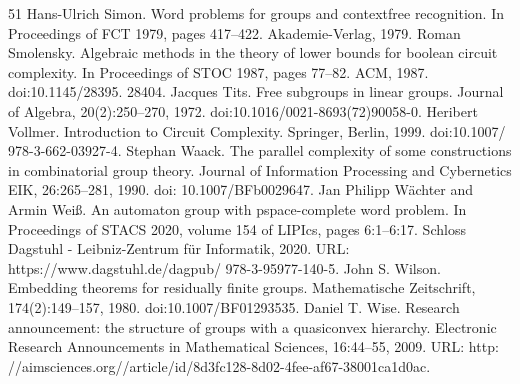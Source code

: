 \documentclass[10pt,a4paper]{article}
\begin{document}
\begin{thebibliography}{51}
 Hans-Ulrich Simon. Word problems for groups and contextfree recognition. In Proceedings of FCT 1979, pages 417–422. Akademie-Verlag, 1979.
 Roman Smolensky. Algebraic methods in the theory of lower bounds for boolean circuit complexity. In Proceedings of STOC 1987, pages 77–82. ACM, 1987. doi:10.1145/28395. 28404.
 Jacques Tits. Free subgroups in linear groups. Journal of Algebra, 20(2):250–270, 1972. doi:10.1016/0021-8693(72)90058-0.
 Heribert Vollmer. Introduction to Circuit Complexity. Springer, Berlin, 1999. doi:10.1007/ 978-3-662-03927-4.
 Stephan Waack. The parallel complexity of some constructions in combinatorial group theory. Journal of Information Processing and Cybernetics EIK, 26:265–281, 1990. doi: 10.1007/BFb0029647.
 Jan Philipp Wächter and Armin Weiß. An automaton group with pspace-complete word problem. In Proceedings of STACS 2020, volume 154 of LIPIcs, pages 6:1–6:17. Schloss Dagstuhl - Leibniz-Zentrum für Informatik, 2020. URL: https://www.dagstuhl.de/dagpub/ 978-3-95977-140-5.
 John S. Wilson. Embedding theorems for residually finite groups. Mathematische Zeitschrift, 174(2):149–157, 1980. doi:10.1007/BF01293535.
 Daniel T. Wise. Research announcement: the structure of groups with a quasiconvex hierarchy. Electronic Research Announcements in Mathematical Sciences, 16:44–55, 2009. URL: http: //aimsciences.org//article/id/8d3fc128-8d02-4fee-af67-38001ca1d0ac.
\end{thebibliography}
\end{document}
